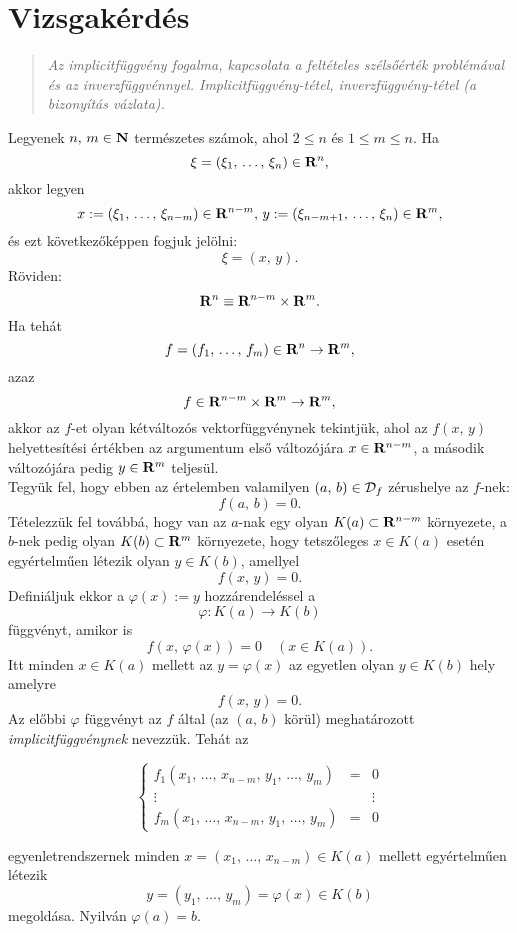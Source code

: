 \newpage
\section{Vizsgakérdés}
\begin{quote}
	\textit{Az implicitfüggvény fogalma, kapcsolata a feltételes szélsőérték problémával és az inverzfüggvénnyel. Implicitfüggvény-tétel, inverzfüggvény-tétel (a bizonyítás vázlata).}
\end{quote}

Legyenek $n, \, m \in \mathbf{N}$ természetes számok, ahol $2 \leq n$ és $1 \leq m \leq n$. Ha
\[
	\xi = (\xi_1, \, \dots, \, \xi_n) \in \mathbf{R}^n,
\]
akkor legyen
\[
	x := (\xi_1, \, \dots, \, \xi_{n-m}) \in \mathbf{R}^{n-m}, \, y := (\xi_{n-m+1}, \, \dots, \, \xi_n) \in \mathbf{R}^m,
\]
és ezt következőképpen fogjuk jelölni:
\[
	\xi = (x, \, y).
\]
Röviden:
\[
	\mathbf{R}^n \equiv \mathbf{R}^{n-m} \times \mathbf{R}^{m}.
\]
Ha tehát
\[
	f = (f_1, \, \dots, \, f_m) \in \mathbf{R}^n \to \mathbf{R}^m,
\]
azaz
\[
	f \in \mathbf{R}^{n-m} \times \mathbf{R}^m \to \mathbf{R}^m,
\]
akkor az $f$-et olyan kétváltozós vektorfüggvénynek tekintjük, ahol az $f(x, \, y)$ helyettesítési értékben az argumentum első változójára $x \in \mathbf{R}^{n-m}$, a második változójára pedig $y \in \mathbf{R}^m$ teljesül.\\

Tegyük fel, hogy ebben az értelemben valamilyen $(a, \, b) \in \mathcal{D}_f$ zérushelye az $f$-nek:
\[
	f(a, \, b) = 0.
\]
Tételezzük fel továbbá, hogy van az $a$-nak egy olyan $K(a) \subset \mathbf{R}^{n-m}$ környezete, a $b$-nek pedig olyan $K(b) \subset \mathbf{R}^m$ környezete, hogy tetszőleges $x \in K(a)$ esetén egyértelműen létezik olyan $y \in K(b)$, amellyel
\[
	f(x, \, y) = 0.
\]
Definiáljuk ekkor a $\varphi(x) := y$ hozzárendeléssel a
\[
	\varphi : K(a) \to K(b)
\]
függvényt, amikor is
\[
	f(x, \, \varphi(x)) = 0 \quad (x \in K(a)).
\]
Itt minden $x \in K(a)$ mellett az $y = \varphi(x)$ az egyetlen olyan $y \in K(b)$ hely amelyre
\[
	f(x, \, y) = 0.
\]
Az előbbi $\varphi$ függvényt az $f$ által (az $(a, \, b)$ körül) meghatározott \textit{implicitfüggvénynek} nevezzük. Tehát az

\[
	\left\{
	\begin{array}{ccc}
		f_1(x_1, \, \dots, \, x_{n-m}, \, y_1, \, \dots, \, y_m) & = & 0 \\
		\vdots & & \vdots \\
		f_m(x_1, \, \dots, \, x_{n-m}, \, y_1, \, \dots, \, y_m) & = & 0
	\end{array}
	\right.
\]

egyenletrendszernek minden $x = (x_1, \, \dots, \, x_{n-m}) \in K(a)$ mellett egyértelműen létezik
\[
	y = (y_1, \, \dots, \, y_m) = \varphi(x) \in K(b)
\]
megoldása. Nyilván $\varphi(a) = b$.\\

